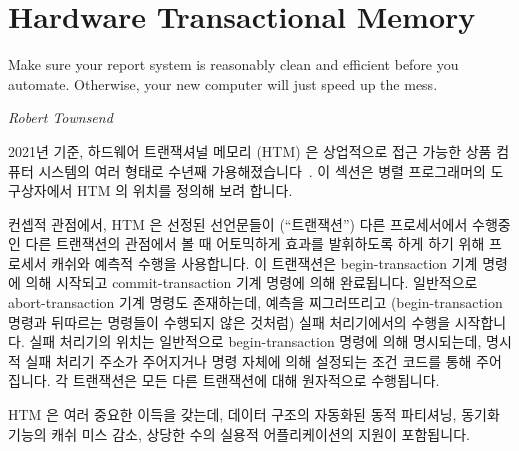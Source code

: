 
\section{Hardware Transactional Memory}
\label{sec:future:Hardware Transactional Memory}
%
\epigraph{Make sure your report system is reasonably clean and efficient
	  before you automate.
	  Otherwise, your new computer will just speed up the mess.}
	 {\emph{Robert Townsend}}

2021년 기준, 하드웨어 트랜잭셔널 메모리 (HTM) 은 상업적으로 접근 가능한 상품
컴퓨터 시스템의 여러 형태로 수년째
가용해졌습니다~\cite{Yoo:2013:PEI:2503210.2503232,RickMerrit2011PowerTM,ChristianJacobi2012MainframeTM,TimothyHayes2020ARM-HTM}.
이 섹션은 병렬 프로그래머의 도구상자에서 HTM 의 위치를 정의해 보려 합니다.

\iffalse

As of 2021, hardware transactional memory (HTM) has been available for many
years on several types of commercially available commodity computer
systems~\cite{Yoo:2013:PEI:2503210.2503232,RickMerrit2011PowerTM,ChristianJacobi2012MainframeTM,TimothyHayes2020ARM-HTM}.
This section makes an attempt to identify HTM's place in the parallel
programmer's toolbox.

\fi

컨셉적 관점에서, HTM 은 선정된 선언문들이 (``트랜잭션'') 다른 프로세서에서
수행중인 다른 트랜잭션의 관점에서 볼 때 어토믹하게 효과를 발휘하도록 하게 하기
위해 프로세서 캐쉬와 예측적 수행을 사용합니다.
이 트랜잭션은 begin-transaction 기계 명령에 의해 시작되고 commit-transaction
기계 명령에 의해 완료됩니다.
일반적으로 abort-transaction 기계 명령도 존재하는데, 예측을 찌그러뜨리고
(begin-transaction 명령과 뒤따르는 명령들이 수행되지 않은 것처럼) 실패
처리기에서의 수행을 시작합니다.
실패 처리기의 위치는 일반적으로 begin-transaction 명령에 의해 명시되는데,
명시적 실패 처리기 주소가 주어지거나 명령 자체에 의해 설정되는 조건 코드를 통해
주어집니다.
각 트랜잭션은 모든 다른 트랜잭션에 대해 원자적으로 수행됩니다.

HTM 은 여러 중요한 이득을 갖는데, 데이터 구조의 자동화된 동적 파티셔닝, 동기화
기능의 캐쉬 미스 감소, 상당한 수의 실용적 어플리케이션의 지원이 포함됩니다.

\iffalse

